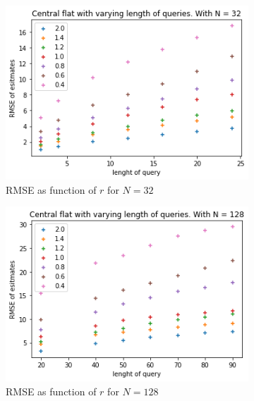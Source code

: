 \documentclass[11pt]{article}
\theoremstyle{definition}
\begin{document}
\begin{figure}[H]
\centering
\begin{subfigure}{.4\textwidth}
  \centering
  \includegraphics[width=\linewidth]{figures/central_flat/varying_r/cen_flat_varying_length_N=32.png}
  \caption{RMSE as function of $r$ for $N=32$}
  \label{fig:a}
\end{subfigure}%
\begin{subfigure}{.4\textwidth}
  \centering
  \includegraphics[width=\linewidth]{figures/central_flat/varying_r/cen_flat_varying_length_N=128.png}
  \caption{RMSE as function of $r$ for $N=128$}
  \label{fig:a}
\end{subfigure}
\begin{subfigure}{.4\textwidth}
  \centering

\end{subfigure}
\end{figure}
\end{document}

